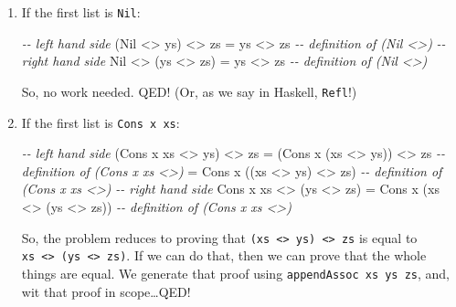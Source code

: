 \documentclass[]{article}
\newenvironment{Shaded}{}{}
\newcommand{\CommentTok}[1]{\textcolor[rgb]{0.38,0.63,0.69}{\textit{#1}}}
\newcommand{\DataTypeTok}[1]{\textcolor[rgb]{0.56,0.13,0.00}{#1}}
\newcommand{\NormalTok}[1]{#1}
\newcommand{\OperatorTok}[1]{\textcolor[rgb]{0.40,0.40,0.40}{#1}}
\newcommand{\OtherTok}[1]{\textcolor[rgb]{0.00,0.44,0.13}{#1}}
\begin{document}
\begin{enumerate}
\def\labelenumi{\arabic{enumi}.}
\item
  If the first list is \texttt{Nil}:

\begin{Shaded}
\begin{Highlighting}[]
\CommentTok{{-}{-} left hand side}
\NormalTok{(}\DataTypeTok{Nil} \OperatorTok{\textless{}\textgreater{}}\NormalTok{ ys) }\OperatorTok{\textless{}\textgreater{}}\NormalTok{ zs}
  \OtherTok{=}\NormalTok{ ys }\OperatorTok{\textless{}\textgreater{}}\NormalTok{ zs        }\CommentTok{{-}{-} definition of \textasciigrave{}(Nil \textless{}\textgreater{})\textasciigrave{}}
\CommentTok{{-}{-} right hand side}
\DataTypeTok{Nil} \OperatorTok{\textless{}\textgreater{}}\NormalTok{ (ys }\OperatorTok{\textless{}\textgreater{}}\NormalTok{ zs)}
  \OtherTok{=}\NormalTok{ ys }\OperatorTok{\textless{}\textgreater{}}\NormalTok{ zs        }\CommentTok{{-}{-} definition of \textasciigrave{}(Nil \textless{}\textgreater{})\textasciigrave{}}
\end{Highlighting}
\end{Shaded}

  So, no work needed. QED! (Or, as we say in Haskell, \texttt{Refl}!)
\item
  If the first list is \texttt{Cons\ x\ xs}:

\begin{Shaded}
\begin{Highlighting}[]
\CommentTok{{-}{-} left hand side}
\NormalTok{(}\DataTypeTok{Cons}\NormalTok{ x xs }\OperatorTok{\textless{}\textgreater{}}\NormalTok{ ys) }\OperatorTok{\textless{}\textgreater{}}\NormalTok{ zs}
  \OtherTok{=}\NormalTok{ (}\DataTypeTok{Cons}\NormalTok{ x (xs }\OperatorTok{\textless{}\textgreater{}}\NormalTok{ ys)) }\OperatorTok{\textless{}\textgreater{}}\NormalTok{ zs   }\CommentTok{{-}{-} definition of \textasciigrave{}(Cons x xs \textless{}\textgreater{})\textasciigrave{}}
  \OtherTok{=} \DataTypeTok{Cons}\NormalTok{ x ((xs }\OperatorTok{\textless{}\textgreater{}}\NormalTok{ ys) }\OperatorTok{\textless{}\textgreater{}}\NormalTok{ zs)   }\CommentTok{{-}{-} definition of \textasciigrave{}(Cons x xs \textless{}\textgreater{})\textasciigrave{}}
\CommentTok{{-}{-} right hand side}
\DataTypeTok{Cons}\NormalTok{ x xs }\OperatorTok{\textless{}\textgreater{}}\NormalTok{ (ys }\OperatorTok{\textless{}\textgreater{}}\NormalTok{ zs)}
  \OtherTok{=} \DataTypeTok{Cons}\NormalTok{ x (xs }\OperatorTok{\textless{}\textgreater{}}\NormalTok{ (ys }\OperatorTok{\textless{}\textgreater{}}\NormalTok{ zs))   }\CommentTok{{-}{-} definition of \textasciigrave{}(Cons x xs \textless{}\textgreater{})\textasciigrave{}}
\end{Highlighting}
\end{Shaded}

  So, the problem reduces to proving that
  \texttt{(xs\ \textless{}\textgreater{}\ ys)\ \textless{}\textgreater{}\ zs} is
  equal to
  \texttt{xs\ \textless{}\textgreater{}\ (ys\ \textless{}\textgreater{}\ zs)}.
  If we can do that, then we can prove that the whole things are equal. We
  generate that proof using \texttt{appendAssoc\ xs\ ys\ zs}, and, wit that
  proof in scope\ldots QED!
\end{enumerate}
\end{document}

